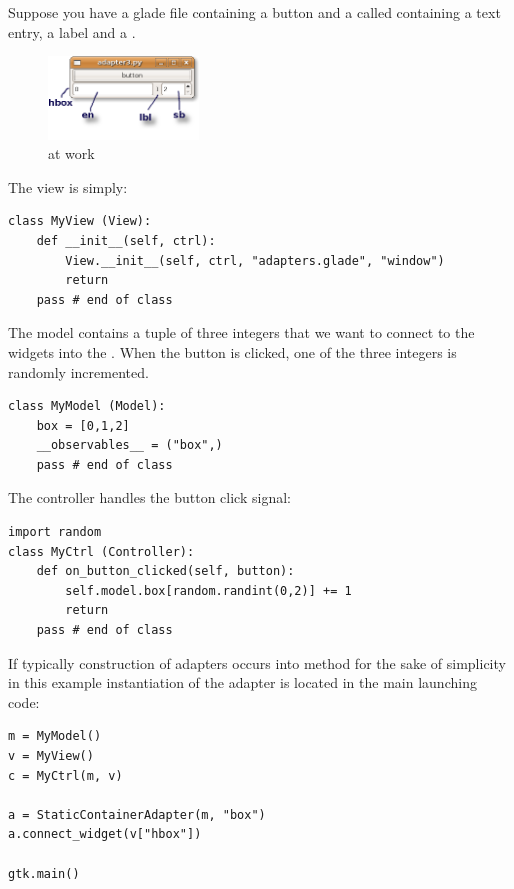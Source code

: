 Suppose you have a glade file containing a button and a
 called  containing a text entry, a
label and a .

\begin{figure}[here]
\begin{center}
\includegraphics[width=4cm]{figs/png/adap2}
\caption{\label{ADAP2_f}  at work}
\end{center}
\end{figure}

The view is simply:

{ \codesize
  \begin{verbatim}
class MyView (View):
    def __init__(self, ctrl):
        View.__init__(self, ctrl, "adapters.glade", "window")
        return
    pass # end of class
  \end{verbatim}
}

The model contains a tuple of three integers that we want to connect
to the widgets into the . When the button is clicked,
one of the three integers is randomly incremented.

{ \codesize
\begin{verbatim}
class MyModel (Model):
    box = [0,1,2]
    __observables__ = ("box",)
    pass # end of class
\end{verbatim}
}

The controller handles the button click signal:
{ \codesize
  \begin{verbatim}
import random
class MyCtrl (Controller):
    def on_button_clicked(self, button):
        self.model.box[random.randint(0,2)] += 1
        return
    pass # end of class
  \end{verbatim}
}

If typically construction of adapters occurs into method
 for the sake of simplicity in this
example instantiation of the adapter is located in the main
launching code:

{ \codesize
\begin{verbatim}
m = MyModel()
v = MyView()
c = MyCtrl(m, v)

a = StaticContainerAdapter(m, "box")
a.connect_widget(v["hbox"])

gtk.main()
\end{verbatim}
}

